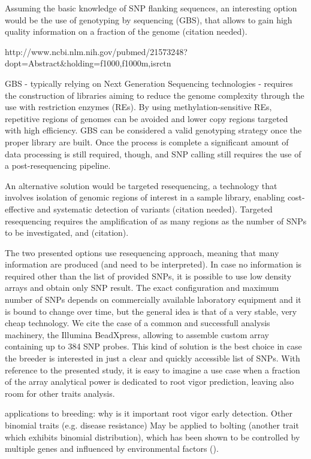 Assuming the basic knowledge of SNP flanking sequences, an interesting
option would be the use of genotyping by sequencing (GBS), that allows
to gain high quality information on a fraction of the genome (citation needed). 

http://www.ncbi.nlm.nih.gov/pubmed/21573248?dopt=Abstract\&holding=f1000,f1000m,isrctn

GBS - typically relying on Next Generation Sequencing technologies - 
requires the construction of libraries aiming to reduce the genome 
complexity through the use with restriction enzymes (REs). By using 
methylation-sensitive REs, repetitive regions of genomes can be avoided 
and lower copy regions targeted with high efficiency.
GBS can be considered a valid genotyping strategy once the proper library
are built. Once the process is complete a significant amount of data 
processing is still required, though, and SNP calling still requires the use
of a post-resequencing pipeline.

An alternative solution would be targeted resequencing, a technology
that involves isolation of genomic regions of interest in a sample library, 
enabling cost-effective and systematic detection of variants (citation needed). 
Targeted resequencing requires the amplification of as many regions as
the number of SNPs to be investigated, and (citation). 

The two presented options use resequencing approach, meaning that many 
information are produced (and need to be interpreted). In case no
information is required other than the list of provided SNPs, 
it is possible to use low density arrays and obtain only
SNP result. The exact configuration and maximum number of SNPs depends on
commercially available laboratory equipment and it is bound to change over
time, but the general idea is that of a very stable, very cheap technology.
We cite the case of a common and successfull analysis machinery,
the Illumina BeadXpress, allowing to assemble custom array containing up 
to 384 SNP probes. This kind of solution is the best choice in case
the breeder is interested in just a clear and quickly accessible list of SNPs.
With reference to the presented study, it is easy to imagine a use case when a fraction
of the array analytical power is dedicated to root vigor prediction, leaving
also room for other traits analysis.

applications to breeding:
why is it important root vigor early detection. Other binomial traits (e.g.
disease resistance) May be applied to bolting (another trait which
exhibits binomial distribution), which has been shown to be controlled
by multiple genes and influenced by environmental factors
(\cite{salah2012genetic}).

